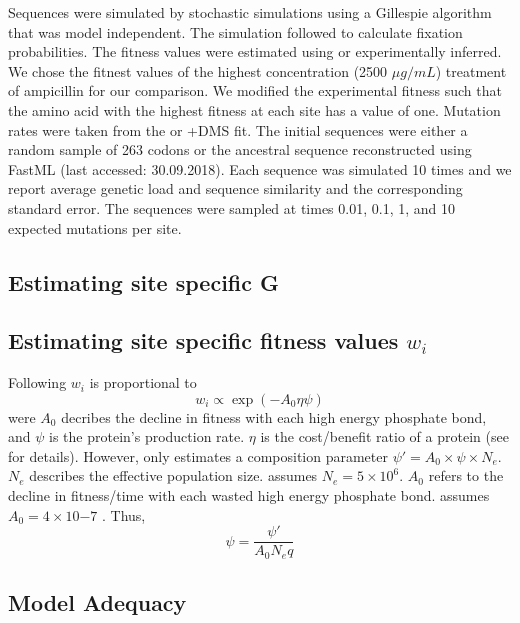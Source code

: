 \documentclass[12pt]{article}
\begin{document}
Sequences were simulated by stochastic simulations using a Gillespie algorithm \citep{gillespie1976} that was model independent.
The simulation followed \citet{SellaAndHirsh2005} to calculate fixation probabilities.
The fitness values were estimated using \selac or experimentally inferred.
We chose the fitnest values of the highest concentration (2500 $\mu g/mL$) treatment of ampicillin for our comparison.
We modified the experimental fitness such that the amino acid with the highest fitness at each site has a value of one.
Mutation rates were taken from the \selac or \selac+DMS fit.
The initial sequences were either a random sample of 263 codons or the ancestral sequence reconstructed using FastML \citep{fastml} (last accessed: 30.09.2018).
Each sequence was simulated 10 times and we report average genetic load and sequence similarity and the corresponding standard error.
The sequences were sampled at times 0.01, 0.1, 1, and 10 expected mutations per site.

\subsection*{Estimating site specific G}


\subsection*{Estimating site specific fitness values $w_i$}

Following \citet{beaulieu2018} $w_i$ is proportional to
\begin{equation}
w_i \propto \exp(-A_0\eta\psi)
\end{equation}
were $A_0$ decribes the decline in fitness with each high energy phosphate bond, and $\psi$ is the protein's production rate.
$\eta$ is the cost/benefit ratio of a protein (see \citep{beaulieu2018} for details). 
However, \selac only estimates a composition parameter $\psi' = A_0\times\psi\times N_e$.
$N_e$ describes the effective population size.
\selac assumes $N_e = 5\times 10^6$.
$A_0$ refers to the decline in fitness/time with each wasted high energy phosphate bond.
\selac assumes $A_0 = 4 \times 10{-7}$ \citep{gilchrist2007}.
Thus, 
\begin{equation}
\psi = \frac{\psi'}{A_0N_eq}
\end{equation}


\subsection*{Model Adequacy}
\end{document}
